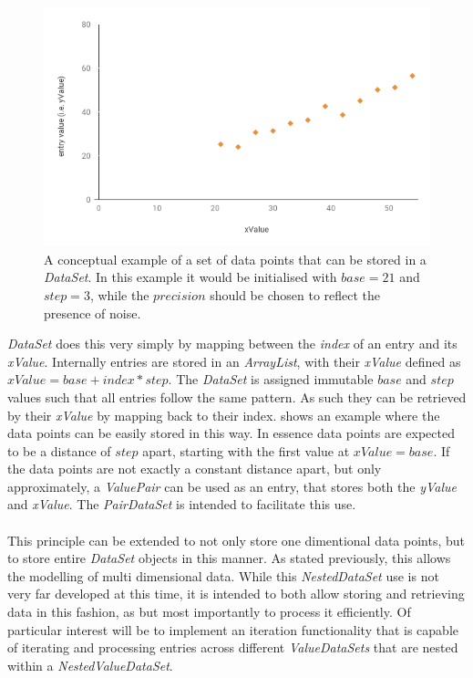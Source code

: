 \documentclass[main.tex]{subfiles}
\begin{document}
      \begin{figure}[h]
        \centering
        \includegraphics[width=0.75\linewidth]{figures/dataSetGraph}
        \caption{A conceptual example of a set of data points that can be stored in a \textit{DataSet}. In this example it would be initialised with $base=21$ and $step=3$, while the $precision$ should be chosen to reflect the presence of noise.}
        \label{fig:dataSetGraph}
      \end{figure}
    
      \textit{DataSet} does this very simply by mapping between the \textit{index} of an entry and its \textit{xValue}. Internally entries are stored in an \textit{ArrayList}, with their \textit{xValue} defined as $xValue= base + index * step$. The \textit{DataSet} is assigned immutable $base$ and $step$ values such that all entries follow the same pattern. As such they can be retrieved by their \textit{xValue} by mapping back to their index.  shows an example where the data points can be easily stored in this way. In essence data points are expected to be a distance of $step$ apart, starting with the first value at $xValue=base$. If the data points are not exactly a constant distance apart, but only approximately, a \textit{ValuePair} can be used as an entry, that stores both the \textit{yValue} and \textit{xValue}. The \textit{PairDataSet} is intended to facilitate this use.
      \\\\
      This principle can be extended to not only store one dimentional data points, but to store entire \textit{DataSet} objects in this manner. As stated previously, this allows the modelling of multi dimensional data. While this \textit{NestedDataSet} use is not very far developed at this time, it is intended to both allow storing and retrieving data in this fashion, as but most importantly to process it efficiently. Of particular interest will be to implement an iteration functionality that is capable of iterating and processing entries across different \textit{ValueDataSets} that are nested within a \textit{NestedValueDataSet}.
      
\end{document}
